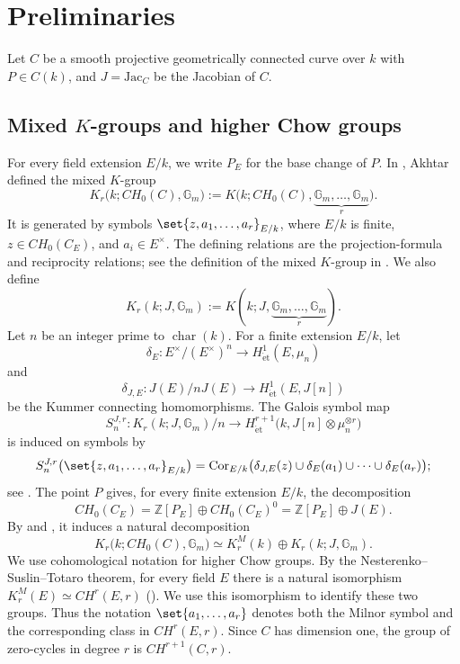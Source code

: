 \documentclass[a4paper,12pt]{amsart}
\numberwithin{equation}{section}
\theoremstyle{definition}
\newcommand{\Char}{\operatorname{char}}
\newcommand{\Cor}{\operatorname{Cor}}
\newcommand{\Gm}{\mathbb{G}_{m}}
\newcommand{\Z}{\mathbb{Z}}
\newcommand{\Het}{H_{\mathrm{\acute et}}}
\begin{document}
\section{Preliminaries}

Let $C$ be a smooth projective geometrically connected curve over $k$ with $P\in C(k)$, and $J = \mathrm{Jac}_C$ be the Jacobian of $C$.

\subsection{Mixed \texorpdfstring{$K$}{K}-groups and higher Chow groups}
For every field extension $E/k$, we write $P_E$ for the base change of $P$.
In \cite{Akh04}, Akhtar defined the mixed $K$-group
\[
 K_r\bigl(k;CH_0(C),\Gm\bigr)
 :=K\bigl(k;CH_0(C),\underbrace{\Gm,\ldots,\Gm}_{r}\bigr).
\]
It is generated by symbols
$\set{z,a_1,\ldots,a_r}_{E/k}$, where $E/k$ is finite,
$z\in CH_0(C_E)$, and $a_i\in E^\times$.  The defining relations are
the projection-formula and reciprocity relations; see the definition of
the mixed $K$-group in \cite[Section~3]{Akh04}. 
We also define 
\[
K_r(k;J,\Gm) :=  K(k;J,\underbrace{\Gm,\ldots,\Gm}_{r}).
\]
Let $n$ be an integer prime to $\Char(k)$.  For a finite extension $E/k$, let
\[
 \delta_E\colon E^\times/(E^\times)^n\to \Het^1(E,\mu_n)
\]
and
\[
 \delta_{J,E}\colon J(E)/nJ(E)\to \Het^1(E,J[n])
\]
be the Kummer connecting homomorphisms.  The Galois symbol map
\[
 S_n^{J,r}\colon K_r(k;J,\Gm)/n
 \to \Het^{r+1}\bigl(k,J[n]\otimes\mu_n^{\otimes r}\bigr)
\]
is induced on symbols by
\begin{equation}\label{eq:GS}
 S_n^{J,r}\bigl(\set{z,a_1,\ldots,a_r}_{E/k}\bigr)
 =\Cor_{E/k}\bigl(
 \delta_{J,E}(z)\cup\delta_E(a_1)\cup\cdots\cup\delta_E(a_r)
 \bigr);
\end{equation}
see \cite[Lemma~1.6]{Som90}.
The point $P$ gives, for every finite extension $E/k$, the decomposition
\[
 CH_0(C_E)=\Z[P_E]\oplus CH_0(C_E)^0
          =\Z[P_E]\oplus J(E).
\]
By \cite[Corollary~5.4.5]{Akh00} and
\cite[Proposition~1.5]{Som90}, it induces a natural decomposition
\begin{equation}\label{eq:split}
 K_r\bigl(k;CH_0(C),\Gm\bigr)
 \simeq
 K_r^M(k)\oplus
 K_r(k;J,\Gm).
\end{equation}
We use cohomological notation for higher Chow groups.  By the
Nesterenko--Suslin--Totaro theorem, for every field $E$ there is a
natural isomorphism $K_r^M(E)\simeq CH^r(E,r)$ (\cite{NS90,Tot92}).  
We use this isomorphism to identify these two
groups.  Thus the notation $\set{a_1,\ldots,a_r}$ denotes both the
Milnor symbol and the corresponding class in $CH^r(E,r)$.  Since $C$
has dimension one, the group of zero-cycles in degree $r$ is
$CH^{r+1}(C,r)$.
\end{document}
